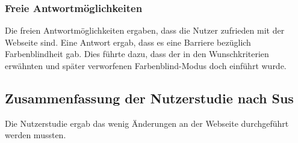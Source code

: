 \subsubsection{Freie Antwortmöglichkeiten}
Die freien Antwortmöglichkeiten ergaben, dass die Nutzer zufrieden mit der Webseite sind. 
Eine Antwort ergab, dass es eine Barriere bezüglich Farbenblindheit gab.
Dies führte dazu, dass der in den Wunschkriterien erwähnten und später verworfenen Farbenblind-Modus doch einführt wurde. 

\subsection{Zusammenfassung der Nutzerstudie nach Sus}

Die Nutzerstudie ergab das wenig Änderungen an der Webseite durchgeführt werden mussten.
